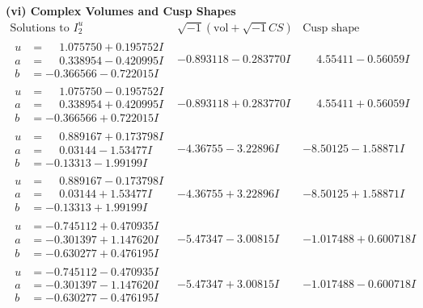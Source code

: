 \documentclass[1p]{elsarticle_modified}
\theoremstyle{definition}
\newcommand{\I}{\sqrt{-1}}
\begin{document}
\newpage\flushleft \textbf{(vi) Complex Volumes and Cusp Shapes}
$$\begin{array}{c|c|c}  
\text{Solutions to }I^u_{2}& \I (\text{vol} + \sqrt{-1}CS) & \text{Cusp shape}\\
 \hline 
\begin{aligned}
u &= \phantom{-}1.075750 + 0.195752 I \\
a &= \phantom{-}0.338954 - 0.420995 I \\
b &= -0.366566 - 0.722015 I\end{aligned}
 & -0.893118 - 0.283770 I & \phantom{-}4.55411 - 0.56059 I \\ \hline\begin{aligned}
u &= \phantom{-}1.075750 - 0.195752 I \\
a &= \phantom{-}0.338954 + 0.420995 I \\
b &= -0.366566 + 0.722015 I\end{aligned}
 & -0.893118 + 0.283770 I & \phantom{-}4.55411 + 0.56059 I \\ \hline\begin{aligned}
u &= \phantom{-}0.889167 + 0.173798 I \\
a &= \phantom{-}0.03144 - 1.53477 I \\
b &= -0.13313 - 1.99199 I\end{aligned}
 & -4.36755 - 3.22896 I & -8.50125 - 1.58871 I \\ \hline\begin{aligned}
u &= \phantom{-}0.889167 - 0.173798 I \\
a &= \phantom{-}0.03144 + 1.53477 I \\
b &= -0.13313 + 1.99199 I\end{aligned}
 & -4.36755 + 3.22896 I & -8.50125 + 1.58871 I \\ \hline\begin{aligned}
u &= -0.745112 + 0.470935 I \\
a &= -0.301397 + 1.147620 I \\
b &= -0.630277 + 0.476195 I\end{aligned}
 & -5.47347 - 3.00815 I & -1.017488 + 0.600718 I \\ \hline\begin{aligned}
u &= -0.745112 - 0.470935 I \\
a &= -0.301397 - 1.147620 I \\
b &= -0.630277 - 0.476195 I\end{aligned}
 & -5.47347 + 3.00815 I & -1.017488 - 0.600718 I \\ \hline\begin{aligned}

\end{aligned}
\end{array}$$
\end{document}
